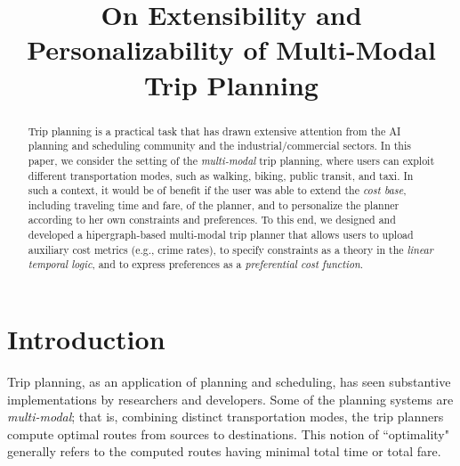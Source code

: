 \documentclass[letterpaper]{article}
\newcommand{\tit}[1]{\textit{#1}}
\begin{document}
%
\title{On Extensibility and Personalizability of Multi-Modal Trip Planning}
\maketitle
\begin{abstract}
	Trip planning is a practical task that has drawn
	extensive attention from the AI planning and scheduling community
	and the industrial/commercial sectors.
	In this paper, we consider the setting of the \tit{multi-modal}
	trip planning, where users can exploit different transportation
	modes, such as walking, biking, public transit, and taxi.
	In such a context, it would be of benefit if the
	user was able to extend the \tit{cost base}, including traveling time 
	and fare, of the planner, and to personalize the planner according
	to her own constraints and preferences.
	To this end, we designed and developed a hipergraph-based multi-modal
	trip planner that allows users to upload auxiliary cost metrics (e.g.,
	crime rates), to specify constraints as a theory in the 
	\tit{linear temporal logic}, and to express preferences as a 
	\tit{preferential cost function}.
\end{abstract}

\section{Introduction}
Trip planning, as an application of planning and scheduling,
has seen substantive implementations by researchers and
developers\cite{bast2015route}.
Some of the planning systems are \tit{multi-modal}; that is,
combining distinct transportation modes, the trip planners
compute optimal routes from sources to destinations.
This notion of ``optimality" generally refers to the computed routes
having minimal total time or total fare.
\end{document}
